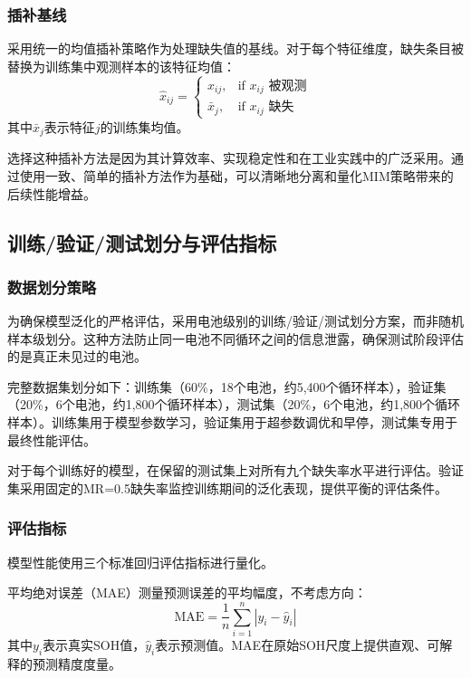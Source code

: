 \documentclass[10pt,a4paper]{ctexart}
\begin{document}
\subsubsection{插补基线}

采用统一的均值插补策略作为处理缺失值的基线。对于每个特征维度，缺失条目被替换为训练集中观测样本的该特征均值：
\begin{equation}
    \hat{x}_{ij} = \begin{cases}
        x_{ij}, & \text{if } x_{ij} \text{ 被观测} \\
        \bar{x}_j, & \text{if } x_{ij} \text{ 缺失}
    \end{cases}
\end{equation}
其中$\bar{x}_j$表示特征$j$的训练集均值。

选择这种插补方法是因为其计算效率、实现稳定性和在工业实践中的广泛采用。通过使用一致、简单的插补方法作为基础，可以清晰地分离和量化MIM策略带来的后续性能增益。

\subsection{训练/验证/测试划分与评估指标}\label{sec:evaluation}

\subsubsection{数据划分策略}

为确保模型泛化的严格评估，采用电池级别的训练/验证/测试划分方案，而非随机样本级划分。这种方法防止同一电池不同循环之间的信息泄露，确保测试阶段评估的是真正未见过的电池。

完整数据集划分如下：训练集（60\%，18个电池，约5,400个循环样本），验证集（20\%，6个电池，约1,800个循环样本），测试集（20\%，6个电池，约1,800个循环样本）。训练集用于模型参数学习，验证集用于超参数调优和早停，测试集专用于最终性能评估。

对于每个训练好的模型，在保留的测试集上对所有九个缺失率水平进行评估。验证集采用固定的MR=0.5缺失率监控训练期间的泛化表现，提供平衡的评估条件。

\subsubsection{评估指标}

模型性能使用三个标准回归评估指标进行量化。

平均绝对误差（MAE）测量预测误差的平均幅度，不考虑方向：
\begin{equation}
    \text{MAE} = \frac{1}{n} \sum_{i=1}^{n} |y_i - \hat{y}_i|
\end{equation}
其中$y_i$表示真实SOH值，$\hat{y}_i$表示预测值。MAE在原始SOH尺度上提供直观、可解释的预测精度度量。
\end{document}

